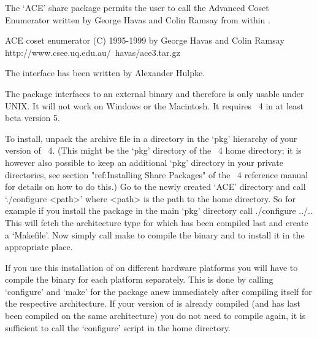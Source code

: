 

The `ACE' share package permits the user to call the Advanced Coset 
Enumerator written by George Havas and Colin Ramsay from within {\GAP}. 

\begintt
ACE coset enumerator (C) 1995-1999 by George Havas and Colin Ramsay
    http://www.csee.uq.edu.au/~havas/ace3.tar.gz
\endtt

The {\GAP} interface has been written by Alexander Hulpke.

The package interfaces to an external binary and therefore is only usable
under UNIX. It will not work on Windows or the Macintosh. It requires
{\GAP}~4 in at least beta version 5.


To install, unpack the archive file in a directory in the `pkg' hierarchy of
your version of {\GAP}~4. (This might be the `pkg' directory of the
{\GAP}~4 home directory; it is however also possible to keep an additional
`pkg' directory in your private directories, see section "ref:Installing
Share Packages" of the {\GAP}~4 reference manual for details on how to do
this.) Go to the newly created `ACE' directory and call `./configure <path>'
where <path> is the path to the {\GAP} home directory. So for example if you
install the package in the main `pkg' directory call
\begintt
./configure ../..
\endtt
This will fetch the architecture type for which {\GAP} has been compiled last
and create a `Makefile'. 
Now simply call
\begintt
make
\endtt
to compile the binary and to install it in the appropriate place.

If you use this installation of {\GAP} on different hardware platforms you will
have to compile the binary for each platform separately. This is done by
calling `configure' and `make' for the package anew immediately after
compiling {\GAP} itself for the respective architecture.
If your version of {\GAP} is already compiled (and has last been compiled on
the same architecture) you do not need to compile {\GAP}
again, it is sufficient to call the `configure' script in the {\GAP} home
directory.

